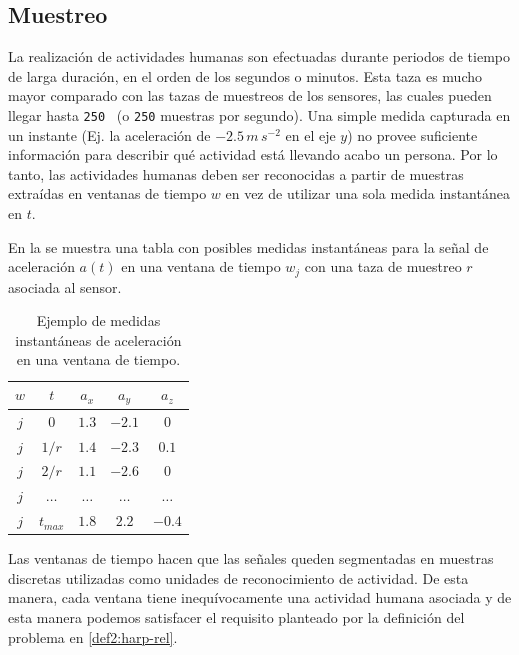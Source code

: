 \subsection{Muestreo}

\label{ssec44:sampling}La realización de actividades humanas son
efectuadas durante periodos de tiempo de larga duración, en el orden
de los segundos o minutos. Esta taza es mucho mayor comparado con
las tazas de muestreos de los sensores, las cuales pueden llegar hasta
\texttt{250 } (o \texttt{250} muestras por segundo). Una
simple medida capturada en un instante (Ej. la aceleración de $-2.5\,m\,s^{-2}$
en el eje $y$) no provee suficiente información para describir qué
actividad está llevando acabo un persona. Por lo tanto, las actividades
humanas deben ser reconocidas a partir de muestras extraídas en ventanas
de tiempo $w$ en vez de utilizar una sola medida instantánea en $t$. 

En la  se muestra una tabla con posibles medidas
instantáneas para la señal de aceleración $a(t)$ en una ventana de
tiempo $w_{j}$ con una taza de muestreo $r$ asociada al sensor.

\begin{table}[!tbph]
\begin{centering}
\begin{tabular}{|c|c|c|c|c|}
\hline 
$w$ & $t$ & $a_{x}$ & $a_{y}$ & $a_{z}$\tabularnewline
\hline 
\hline 
$j$ & $0$ & \texttt{$1.3$} & \texttt{$-2.1$} & \texttt{$0$}\tabularnewline
\hline 
$j$ & $1/r$ & \texttt{$1.4$} & \texttt{$-2.3$} & \texttt{$0.1$}\tabularnewline
\hline 
$j$ & $2/r$ & \texttt{$1.1$} & \texttt{$-2.6$} & \texttt{$0$}\tabularnewline
\hline 
$j$ & $\ldots$ & \texttt{$\ldots$} & \texttt{$\ldots$} & \texttt{$\ldots$}\tabularnewline
\hline 
$j$ & $t_{max}$ & \texttt{$1.8$} & \texttt{$2.2$} & \texttt{$-0.4$}\tabularnewline
\hline 
\end{tabular}
\par\end{centering}
\caption[Medidas instantáneas de aceleración ]{\label{tab4:ex-signal}Ejemplo de medidas instantáneas de aceleración
en una ventana de tiempo.}
\end{table}

Las ventanas de tiempo hacen que las señales queden segmentadas en
muestras discretas utilizadas como unidades de reconocimiento de actividad.
De esta manera, cada ventana tiene inequívocamente una actividad humana
asociada y de esta manera podemos satisfacer el requisito planteado
por la definición del problema en \ref{def2:harp-rel}. 

